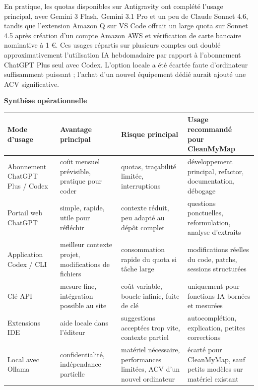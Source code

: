 \documentclass[
  10pt,
  a4paper,
  DIV=11,
  numbers=noendperiod,
  oneside]{scrreprt}
\newcounter{none} %
\let\oldtextbf\textbf
\renewcommand{\textbf}[1]{\oldtextbf{\textcolor{cmmnavy}{#1}}}
\begin{document}
En pratique, les quotas disponibles sur Antigravity ont complété l'usage
principal, avec Gemini 3 Flash, Gemini 3.1 Pro et un peu de Claude
Sonnet 4.6, tandis que l'extension Amazon Q sur VS Code offrait un large
quota sur Sonnet 4.5 après création d'un compte Amazon AWS et
vérification de carte bancaire nominative à 1 €. Ces usages répartis sur
plusieurs comptes ont doublé approximativement l'utilisation IA
hebdomadaire par rapport à l'abonnement ChatGPT Plus seul avec Codex.
L'option locale a été écartée faute d'ordinateur suffisamment puissant ;
l'achat d'un nouvel équipement dédié aurait ajouté une ACV
significative.

\textbf{Synthèse opérationnelle}

{\def\LTcaptype{none} %
\begin{longtable}[]{@{}
  >{\raggedright\arraybackslash}p{}
  >{\raggedright\arraybackslash}p{}
  >{\raggedright\arraybackslash}p{}
  >{\raggedright\arraybackslash}p{}@{}}
\toprule\noalign{}
\begin{minipage}[b]{\linewidth}\raggedright
Mode d'usage
\end{minipage} & \begin{minipage}[b]{\linewidth}\raggedright
Avantage principal
\end{minipage} & \begin{minipage}[b]{\linewidth}\raggedright
Risque principal
\end{minipage} & \begin{minipage}[b]{\linewidth}\raggedright
Usage recommandé pour CleanMyMap
\end{minipage} \\
\midrule\noalign{}
\endhead
\bottomrule\noalign{}
\endlastfoot
Abonnement ChatGPT Plus / Codex & coût mensuel prévisible, pratique pour
coder & quotas, traçabilité limitée, interruptions & développement
principal, refactor, documentation, débogage \\
Portail web ChatGPT & simple, rapide, utile pour réfléchir & contexte
réduit, peu adapté au dépôt complet & questions ponctuelles,
reformulation, analyse d'extraits \\
Application Codex / CLI & meilleur contexte projet, modifications de
fichiers & consommation rapide du quota si tâche large & modifications
réelles du code, patchs, sessions structurées \\
Clé API & mesure fine, intégration possible au site & coût variable,
boucle infinie, fuite de clé & uniquement pour fonctions IA bornées et
mesurées \\
Extensions IDE & aide locale dans l'éditeur & suggestions acceptées trop
vite, contexte partiel & autocomplétion, explication, petites
corrections \\
Local avec Ollama & confidentialité, indépendance partielle & matériel
nécessaire, performances limitées, ACV d'un nouvel ordinateur & écarté
pour CleanMyMap, sauf petits modèles sur matériel existant \\
\end{longtable}
}
\end{document}
